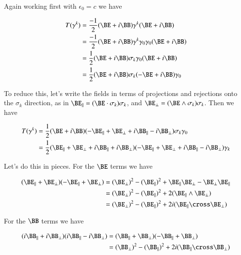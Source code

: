 \documentclass{article}
\begin{document}
Again working first with $\epsilon_0 = c$ we have

\begin{align*}
T(\gamma^k) 
&= \frac{-1}{2} (\BE + i \BB) \gamma^k (\BE + i \BB) \\
&= \frac{-1}{2} (\BE + i \BB) \gamma^k \gamma_0 \gamma_0 (\BE + i \BB) \\
&= \frac{1}{2} (\BE + i \BB) \sigma_k \gamma_0 (\BE + i \BB) \\
&= \frac{1}{2} (\BE + i \BB) \sigma_k (-\BE + i \BB) \gamma_0 \\
\end{align*}

To reduce this, let's write the fields in terms of projections and rejections onto the $\sigma_k$ direction, as in $\BE_\parallel = (\BE \cdot \sigma_k) \sigma_k$, and $\BE_\perp = (\BE \wedge \sigma_k) \sigma_k$.  Then we have

\begin{align*}
T(\gamma^k) 
&= \frac{1}{2} (\BE + i \BB) (-\BE_\parallel +\BE_\perp + i \BB_\parallel - i \BB_\perp) \sigma_k \gamma_0 \\
&= \frac{1}{2} 
(\BE_\parallel + \BE_\perp + i \BB_\parallel + i \BB_\perp) (-\BE_\parallel +\BE_\perp + i \BB_\parallel - i \BB_\perp) 
\gamma_k \\
\end{align*}

Let's do this in pieces.  For the $\BE$ terms we have

\begin{align*}
(\BE_\parallel + \BE_\perp) (-\BE_\parallel +\BE_\perp) 
&=
(\BE_\perp)^2 -(\BE_\parallel)^2 
+\BE_\parallel \BE_\perp
-\BE_\perp \BE_\parallel  \\
&= (\BE_\perp)^2 -(\BE_\parallel)^2 +    {2} (\BE_\parallel \wedge \BE_\perp) \\
&= (\BE_\perp)^2 -(\BE_\parallel)^2 +    {2}i (\BE_\parallel \cross \BE_\perp)
\end{align*}

For the $\BB$ terms we have

\begin{align*}
(i \BB_\parallel + i \BB_\perp) (i \BB_\parallel - i \BB_\perp) 
&= (\BB_\parallel + \BB_\perp) (-\BB_\parallel + \BB_\perp)  \\
&= (\BB_\perp)^2 -(\BB_\parallel)^2 + 2 i (\BB_\parallel \cross \BB_\perp)
\end{align*}
\end{document}
